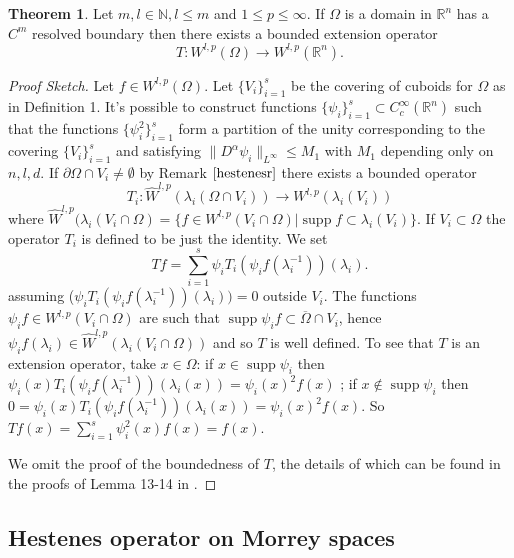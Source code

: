 \documentclass[12pt]{article}
\theoremstyle{definition}
\newtheorem{theorem}{Theorem}
\DeclareMathOperator\supp{supp}
\begin{document}
\begin{theorem}\label{teorh}
Let $m,l \in \mathbb{N}, l\le m$ and $1\le p\le\infty$. If $\Omega$ is a domain in $\mathbb{R}^n$ has a $C^m$ resolved boundary then there exists a bounded extension operator
\[ T: W^{l,p}(\Omega) \rightarrow W^{l,p}(\mathbb{R}^n).\]
\end{theorem}
\begin{proof}[Proof Sketch]
Let $f \in W^{l,p}(\Omega)$. Let $\{V_i\}_{i=1}^s$ be the covering of cuboids for $\Omega$ as in Definition 1. It's possible to construct functions $\{ \psi_i \}_{i=1}^s \subset C^\infty_c(\mathbb{R}^n)$ such that the functions $\{ \psi^2_i \}_{i=1}^s$ form a partition of the unity corresponding to the covering $\{V_i\}_{i=1}^s$ and satisfying $\|D^\alpha \psi_i \|_{L^\infty}\le M_1$ with $M_1$ depending only on $n,l,d$.  If $\partial \Omega \cap V_i \neq \emptyset$ by Remark $\ref{hestenesr}$ there exists a bounded operator
\[ T_i : \widehat W^{l,p}(\lambda_i(\Omega \cap V_i))\rightarrow W^{l,p}(\lambda_i(V_i))\]
where $\widehat W^{l,p}(\lambda_i(V_i\cap \Omega)=\{f \in W^{l,p}(V_i\cap \Omega) | \supp f \subset \lambda_i(V_i)  \}.$ If $V_i \subset \Omega$ the operator $T_i$ is defined to be just the identity. We set
\[ Tf = \sum_{i=1}^s \psi_iT_i(\psi_if(\lambda_i^{-1}))(\lambda_i).\]
assuming ($\psi_iT_i(\psi_if(\lambda_i^{-1}))(\lambda_i))=0$ outside $V_i$. The functions $\psi_if \in W^{l,p}(V_i\cap \Omega)$ are such that $\supp \psi_if \subset \overline \Omega \cap V_i$, hence $\psi_i f(\lambda_i) \in \widehat W^{l,p}(\lambda_i(V_i\cap \Omega))$ and so $T$ is well defined. To see that $T$ is an extension operator, take $x \in \Omega$: if $x \in \supp \psi_i$ then $\psi_i(x)T_i(\psi_if(\lambda_i^{-1}))(\lambda_i(x))=\psi_i(x)^2 f(x)$ ; if $x \notin \supp \psi_i$ then $0=\psi_i(x)T_i(\psi_if(\lambda_i^{-1}))(\lambda_i(x))=\psi_i(x)^2 f(x)$. So $Tf(x)=\sum\limits_{i=1}^s \psi_i^2(x) f(x)=f(x)$. 

We omit the proof of the boundedness of $T$, the details of which can be found in the proofs of Lemma 13-14 in \cite{burenkov}.
\end{proof}

\subsection{Hestenes operator on Morrey spaces}
\end{document}
